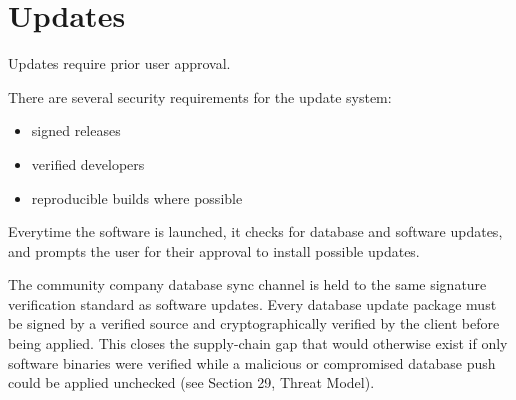 
\chapter{Updates}

Updates require prior user approval.

There are several security requirements for the update system:

\begin{itemize}
	\item signed releases
	\item verified developers
	\item reproducible builds where possible
\end{itemize}

Everytime the software is launched, it checks for database and software updates, and prompts the user for their approval to install possible updates.

The community company database sync channel is held to the same signature verification standard as software updates. Every database update package must be signed by a verified source and cryptographically verified by the client before being applied. This closes the supply-chain gap that would otherwise exist if only software binaries were verified while a malicious or compromised database push could be applied unchecked (see Section 29, Threat Model).


\sentinelchapterend
